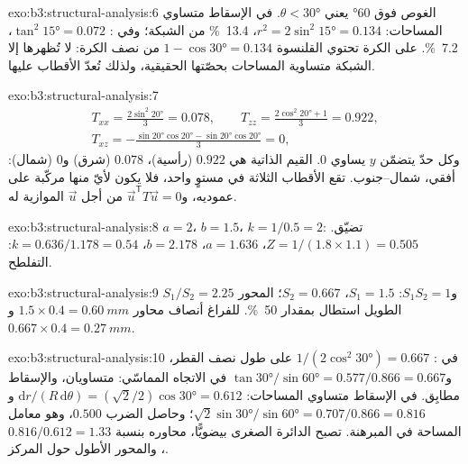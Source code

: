 \begin{solution}{exo:b3:structural-analysis:6}
الغوص فوق \ang{60} يعني $\theta < \ang{30}$. في الإسقاط متساوي المساحات: $r^2 =
2\sin^2\ang{15} = 0.134$، \qty{13.4}{\percent} من الشبكة؛ وفي :
$\tan^2\ang{15} = 0.072$، \qty{7.2}{\percent}. على الكرة تحتوي القلنسوة
$1 - \cos\ang{30} = 0.134$ من نصف الكرة: لا تُظهرها إلا الشبكة متساوية المساحات
بحصّتها الحقيقية، ولذلك تُعدّ الأقطاب عليها.
\end{solution}

\begin{solution}{exo:b3:structural-analysis:7}
\begin{gather*}
  T_{xx} = \frac{2\sin^2\ang{20}}3 = 0.078,\qquad
  T_{zz} = \frac{2\cos^2\ang{20} + 1}3 = 0.922,\\
  T_{xz} = -\frac{\sin\ang{20}\cos\ang{20} - \sin\ang{20}\cos\ang{20}}3 = 0,
\end{gather*}
وكل حدّ يتضمّن $y$ يساوي 0. القيم الذاتية هي $0.922$ (رأسية)،
$0.078$ (شرق) و$0$ (شمال):  أفقي، شمال--جنوب.
تقع الأقطاب الثلاثة في مستوٍ واحد، فلا يكون لأيّ منها مركّبة على عموديه،
و$\vec u^{\mathsf T}T\vec u = 0$ من أجل $\vec u$ الموازية له.
\end{solution}

\begin{solution}{exo:b3:structural-analysis:8}
$a = 2$، $b = 1.5$، $k = 1/0.5 = 2$: تضيّق. $Z = 1/(1.8\times1.1) =
0.505$، $a = 1.636$، $b = 2.178$، $k = 0.636/1.178 = 0.54$: التفلطح.
\end{solution}

\begin{solution}{exo:b3:structural-analysis:9}
$S_1/S_2 = 2.25$ و$S_1S_2 = 1$: $S_1 = 1.5$، $S_2 = 0.667$؛ المحور الطويل
استطال بمقدار \qty{50}{\percent}. للفراغ أنصاف محاور $1.5\times0.4 =
\qty{0.60}{mm}$ و$0.667\times0.4 = \qty{0.27}{mm}$.
\end{solution}

\begin{solution}{exo:b3:structural-analysis:10}
في : $1/(2\cos^2\ang{30}) = 0.667$ على طول نصف القطر،
و$\tan\ang{30}/\sin\ang{60} = 0.577/0.866 = 0.667$ في الاتجاه المماسّي: متساويان، والإسقاط مطابِق.
في الإسقاط متساوي المساحات: $\mathrm dr/(R\,\mathrm d\theta) = (\sqrt2/2)\cos\ang{30} = 0.612$
و$\sqrt2\sin\ang{30}/\sin\ang{60} = 0.707/0.866 = 0.816$؛ وحاصل الضرب
$0.500$، وهو معامل المساحة في المبرهنة. تصبح الدائرة الصغرى بيضويًّا، محاوره
بنسبة $0.816/0.612 = 1.33$، والمحور الأطول حول المركز.
\end{solution}

